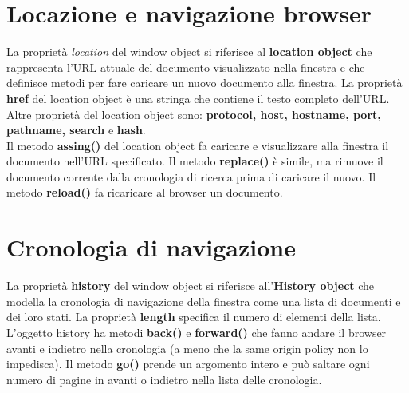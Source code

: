 \section{Locazione e navigazione browser}
La proprietà \emph{location} del window object si riferisce al \textbf{location object} che rappresenta l'URL attuale del documento visualizzato nella finestra e che definisce metodi per fare caricare un nuovo documento alla finestra. La proprietà \textbf{href} del location object è una stringa che contiene il testo completo dell'URL. Altre proprietà del location object sono: \textbf{protocol, host, hostname, port, pathname, search} e \textbf{hash}.\\

Il metodo \textbf{assing()} del location object fa caricare e visualizzare alla finestra il documento nell'URL specificato. Il metodo \textbf{replace()} è simile, ma rimuove il documento corrente dalla cronologia di ricerca prima di caricare il nuovo. Il metodo \textbf{reload()} fa ricaricare al browser un documento. 

\section{Cronologia di navigazione}
La proprietà \textbf{history} del window object si riferisce all'\textbf{History object} che modella la cronologia di navigazione della finestra come una lista di documenti e dei loro stati. La proprietà \textbf{length} specifica il numero di elementi della lista. L'oggetto history ha metodi \textbf{back()} e \textbf{forward()} che fanno andare il browser avanti e indietro nella cronologia (a meno che la same origin policy non lo impedisca). Il metodo \textbf{go()} prende un argomento intero e può saltare ogni numero di pagine in avanti o indietro nella lista delle cronologia.

